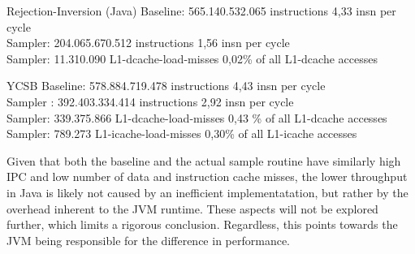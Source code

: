 \begin{perfbox}{Rejection-Inversion (Java)}
\ttfamily
Baseline: 565.140.532.065 instructions 4,33  insn per cycle \\  
Sampler: 204.065.670.512  instructions  1,56 insn per cycle   \\
Sampler: 11.310.090  L1-dcache-load-misses  0,02\% of all L1-dcache accesses 
\end{perfbox}

\begin{perfbox}{YCSB}
\ttfamily
Baseline: 578.884.719.478 instructions 4,43 insn per cycle \\         
Sampler : 392.403.334.414  instructions 2,92  insn per cycle \\
Sampler: 339.375.866 L1-dcache-load-misses  0,43 \% of all L1-dcache accesses \\ 
Sampler: 789.273 L1-icache-load-misses 0,30\% of all L1-icache accesses 
\end{perfbox}

Given that both the baseline and the actual sample routine have similarly high IPC and low number of data and instruction cache misses, the lower throughput in Java is likely 
not caused by an inefficient implementatation, but rather by the overhead inherent to the JVM runtime. These aspects
will not be explored further, which limits a rigorous conclusion. Regardless, this points towards the JVM being responsible for the difference in performance.